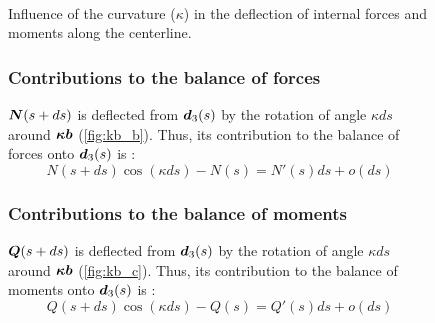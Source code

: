\begin{figure}[p]
  \begin{leftfullpage}
    \captionsetup[subfloat]{captionskip=10pt}
     	\centering
     	 \\
	\vspace{30pt}
	\vspace{30pt}
	\caption{Influence of the curvature ($\kappa$) in the deflection of internal forces and moments along the centerline.}     
	\label{fig:kb}
 \end{leftfullpage}
\end{figure}
\begin{figure}[p]
	\begin{fullpage}
	\subsubsection{Contributions to the balance of forces}
	\vspace{10pt}
	$\boldsymbol{N}(s+ds)$ is deflected from $\boldsymbol{d}_3(s)$ by the rotation of angle $\kappa ds$ around $\boldsymbol{\kappa b}$ (\cref{fig:kb_b}). Thus, its contribution to the balance of forces onto $\boldsymbol{d}_3(s)$ is : 
	\begin{equation*}
		N(s+ds) \cos(\kappa ds) - N(s) = N'(s) ds + o(ds)
	\end{equation*}	
	\vspace{10pt}
	
	\subsubsection{Contributions to the balance of moments}
	\vspace{10pt}
	$\boldsymbol{Q}(s+ds)$ is deflected from $\boldsymbol{d}_3(s)$ by the rotation of angle $\kappa ds$ around $\boldsymbol{\kappa b}$ (\cref{fig:kb_c}). Thus, its contribution to the balance of moments onto $\boldsymbol{d}_3(s)$ is : 
	\begin{equation*}
		Q(s+ds) \cos(\kappa ds) - Q(s) = Q'(s) ds + o(ds)
	\end{equation*}	
	  \end{fullpage}
\end{figure}

 
